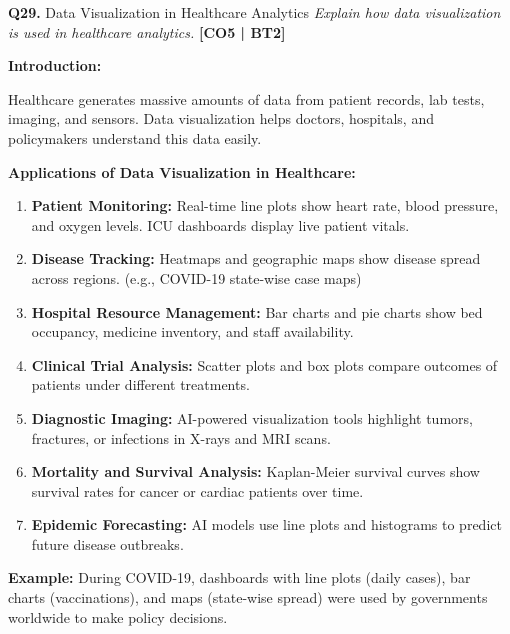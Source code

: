 \documentclass[12pt,a4paper]{article}
\newcommand{\Qno}[1]{\textbf{\color{darkred}Q#1.}}
\newcommand{\term}[1]{\textbf{\color{headingcolor}#1}}
\begin{document}
\vspace{8pt}

\begin{questionbox}{\Qno{29} Data Visualization in Healthcare Analytics}
\textit{Explain how data visualization is used in healthcare analytics.} \hfill \textbf{[CO5 | BT2]}
\end{questionbox}

\begin{answerenv}

\textbf{\color{headingcolor}Introduction:}

Healthcare generates massive amounts of data from patient records, lab tests, imaging, and sensors. Data visualization helps doctors, hospitals, and policymakers understand this data easily.

\vspace{6pt}
\textbf{\color{headingcolor}Applications of Data Visualization in Healthcare:}

\begin{enumerate}[leftmargin=1.8em, itemsep=5pt]
  \item \term{Patient Monitoring:} Real-time line plots show heart rate, blood pressure, and oxygen levels. ICU dashboards display live patient vitals.

  \item \term{Disease Tracking:} Heatmaps and geographic maps show disease spread across regions. (e.g., COVID-19 state-wise case maps)

  \item \term{Hospital Resource Management:} Bar charts and pie charts show bed occupancy, medicine inventory, and staff availability.

  \item \term{Clinical Trial Analysis:} Scatter plots and box plots compare outcomes of patients under different treatments.

  \item \term{Diagnostic Imaging:} AI-powered visualization tools highlight tumors, fractures, or infections in X-rays and MRI scans.

  \item \term{Mortality and Survival Analysis:} Kaplan-Meier survival curves show survival rates for cancer or cardiac patients over time.

  \item \term{Epidemic Forecasting:} AI models use line plots and histograms to predict future disease outbreaks.
\end{enumerate}

\begin{keypoint}
\textbf{Example:} During COVID-19, dashboards with line plots (daily cases), bar charts (vaccinations), and maps (state-wise spread) were used by governments worldwide to make policy decisions.
\end{keypoint}

\end{answerenv}
\end{document}

